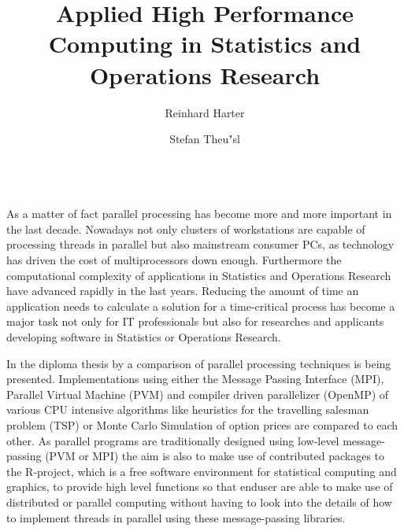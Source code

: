\documentclass{llncs}
\begin{document}
\title{Applied High Performance Computing in Statistics and Operations
Research}

\author{Reinhard Harter \and Stefan Theu"sl}


\maketitle              %


\\
As a matter of fact parallel processing has become more and more
important in the last decade. Nowadays not only clusters of
workstations are capable of processing threads in parallel but also
mainstream consumer PCs, as technology has driven the cost of
multiprocessors down enough. Furthermore the computational complexity of
applications in Statistics and Operations Research have advanced
rapidly in the last years. Reducing the amount of time an application
needs to calculate a solution for a time-critical process has become a
major task not only for IT professionals but also for researches and
applicants developing software in Statistics or Operations Research.  


In the diploma thesis by \cite{theussl07} a comparison of parallel
processing techniques is being presented. Implementations using either
the Message Passing Interface (MPI), Parallel Virtual Machine (PVM)
and compiler driven parallelizer (OpenMP) of various
CPU intensive algorithms like heuristics for the travelling salesman
problem (TSP) or Monte Carlo Simulation of option prices are
compared to each other. 
As parallel programs are traditionally designed using low-level
message-passing (PVM or MPI) the aim is also to make use of
contributed packages to the R-project, which is a free software
environment for statistical
computing and graphics, to provide high level functions so that
enduser are able to make use of distributed or parallel computing
without having to look into the details of how to implement threads in
parallel using these message-passing libraries.
\end{document}
